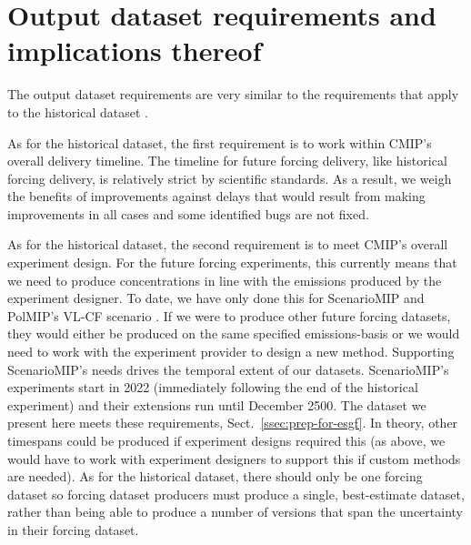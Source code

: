 \section{Output dataset requirements and implications thereof}
\label{sec:output-dataset-requirements}

The output dataset requirements are very similar to the requirements that apply to the historical dataset \citep{nicholls_historical-ghgs_2026}.

As for the historical dataset, the first requirement is to work within CMIP's overall delivery timeline.
The timeline for future forcing delivery, like historical forcing delivery, is relatively strict by scientific standards.
As a result, we weigh the benefits of improvements against delays that would result from making improvements in all cases
and some identified bugs are not fixed.

As for the historical dataset, the second requirement is to meet CMIP's overall experiment design.
For the future forcing experiments, this currently means that we need to produce concentrations in line with the emissions produced by the experiment designer.
To date, we have only done this for ScenarioMIP \citep{van-vuuren_scenariomip_2026}
and PolMIP's VL-CF scenario \citep{tbd_polmip-guidance_2026,hogner_vl-cf-emissions_2026}.
If we were to produce other future forcing datasets,
they would either be produced on the same specified emissions-basis
or we would need to work with the experiment provider to design a new method.
Supporting ScenarioMIP's needs drives the temporal extent of our datasets.
ScenarioMIP's experiments start in 2022 (immediately following the end of the historical experiment)
and their extensions run until December 2500.
The dataset we present here meets these requirements, Sect.~\ref{ssec:prep-for-esgf}.
In theory, other timespans could be produced if experiment designs required this
(as above, we would have to work with experiment designers to support this if custom methods are needed).
As for the historical dataset, there should only be one forcing dataset
so forcing dataset producers must produce a single, best-estimate dataset,
rather than being able to produce a number of versions that span the uncertainty in their forcing dataset.

